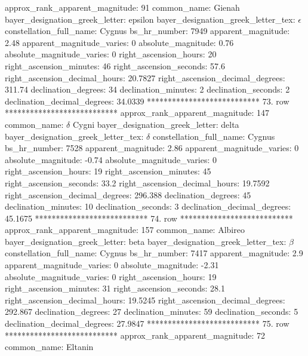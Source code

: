     approx_rank_apparent_magnitude: 91
                       common_name: Gienah
    bayer_designation_greek_letter: epsilon
bayer_designation_greek_letter_tex: $\epsilon$
           constellation_full_name: Cygnus
                      bs_hr_number: 7949
                apparent_magnitude: 2.48
         apparent_magnitude_varies: 0
                absolute_magnitude: 0.76
         absolute_magnitude_varies: 0
             right_ascension_hours: 20
           right_ascension_minutes: 46
           right_ascension_seconds: 57.6
     right_ascension_decimal_hours: 20.7827
   right_ascension_decimal_degrees: 311.74
               declination_degrees: 34
               declination_minutes: 2
               declination_seconds: 2
       declination_decimal_degrees: 34.0339
*************************** 73. row ***************************
    approx_rank_apparent_magnitude: 147
                       common_name: $\delta$ Cygni
    bayer_designation_greek_letter: delta
bayer_designation_greek_letter_tex: $\delta$
           constellation_full_name: Cygnus
                      bs_hr_number: 7528
                apparent_magnitude: 2.86
         apparent_magnitude_varies: 0
                absolute_magnitude: -0.74
         absolute_magnitude_varies: 0
             right_ascension_hours: 19
           right_ascension_minutes: 45
           right_ascension_seconds: 33.2
     right_ascension_decimal_hours: 19.7592
   right_ascension_decimal_degrees: 296.388
               declination_degrees: 45
               declination_minutes: 10
               declination_seconds: 3
       declination_decimal_degrees: 45.1675
*************************** 74. row ***************************
    approx_rank_apparent_magnitude: 157
                       common_name: Albireo
    bayer_designation_greek_letter: beta
bayer_designation_greek_letter_tex: $\beta$
           constellation_full_name: Cygnus
                      bs_hr_number: 7417
                apparent_magnitude: 2.9
         apparent_magnitude_varies: 0
                absolute_magnitude: -2.31
         absolute_magnitude_varies: 0
             right_ascension_hours: 19
           right_ascension_minutes: 31
           right_ascension_seconds: 28.1
     right_ascension_decimal_hours: 19.5245
   right_ascension_decimal_degrees: 292.867
               declination_degrees: 27
               declination_minutes: 59
               declination_seconds: 5
       declination_decimal_degrees: 27.9847
*************************** 75. row ***************************
    approx_rank_apparent_magnitude: 72
                       common_name: Eltanin

